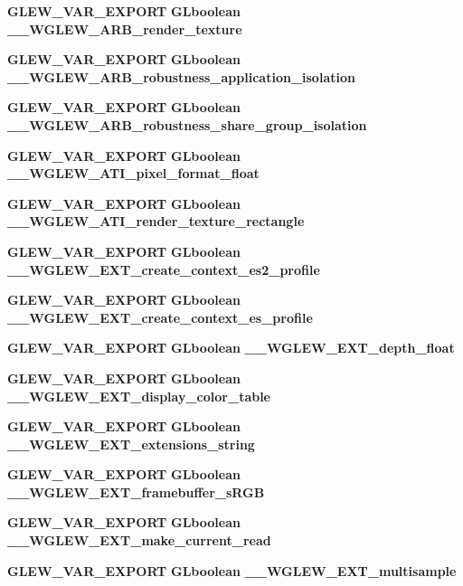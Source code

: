 \begin{DoxyCompactItemize}
{\bf G\+L\+E\+W\+\_\+\+V\+A\+R\+\_\+\+E\+X\+P\+O\+RT} {\bf G\+Lboolean} {\bf \+\_\+\+\_\+\+W\+G\+L\+E\+W\+\_\+\+A\+R\+B\+\_\+render\+\_\+texture}
\item 
{\bf G\+L\+E\+W\+\_\+\+V\+A\+R\+\_\+\+E\+X\+P\+O\+RT} {\bf G\+Lboolean} {\bf \+\_\+\+\_\+\+W\+G\+L\+E\+W\+\_\+\+A\+R\+B\+\_\+robustness\+\_\+application\+\_\+isolation}
\item 
{\bf G\+L\+E\+W\+\_\+\+V\+A\+R\+\_\+\+E\+X\+P\+O\+RT} {\bf G\+Lboolean} {\bf \+\_\+\+\_\+\+W\+G\+L\+E\+W\+\_\+\+A\+R\+B\+\_\+robustness\+\_\+share\+\_\+group\+\_\+isolation}
\item 
{\bf G\+L\+E\+W\+\_\+\+V\+A\+R\+\_\+\+E\+X\+P\+O\+RT} {\bf G\+Lboolean} {\bf \+\_\+\+\_\+\+W\+G\+L\+E\+W\+\_\+\+A\+T\+I\+\_\+pixel\+\_\+format\+\_\+float}
\item 
{\bf G\+L\+E\+W\+\_\+\+V\+A\+R\+\_\+\+E\+X\+P\+O\+RT} {\bf G\+Lboolean} {\bf \+\_\+\+\_\+\+W\+G\+L\+E\+W\+\_\+\+A\+T\+I\+\_\+render\+\_\+texture\+\_\+rectangle}
\item 
{\bf G\+L\+E\+W\+\_\+\+V\+A\+R\+\_\+\+E\+X\+P\+O\+RT} {\bf G\+Lboolean} {\bf \+\_\+\+\_\+\+W\+G\+L\+E\+W\+\_\+\+E\+X\+T\+\_\+create\+\_\+context\+\_\+es2\+\_\+profile}
\item 
{\bf G\+L\+E\+W\+\_\+\+V\+A\+R\+\_\+\+E\+X\+P\+O\+RT} {\bf G\+Lboolean} {\bf \+\_\+\+\_\+\+W\+G\+L\+E\+W\+\_\+\+E\+X\+T\+\_\+create\+\_\+context\+\_\+es\+\_\+profile}
\item 
{\bf G\+L\+E\+W\+\_\+\+V\+A\+R\+\_\+\+E\+X\+P\+O\+RT} {\bf G\+Lboolean} {\bf \+\_\+\+\_\+\+W\+G\+L\+E\+W\+\_\+\+E\+X\+T\+\_\+depth\+\_\+float}
\item 
{\bf G\+L\+E\+W\+\_\+\+V\+A\+R\+\_\+\+E\+X\+P\+O\+RT} {\bf G\+Lboolean} {\bf \+\_\+\+\_\+\+W\+G\+L\+E\+W\+\_\+\+E\+X\+T\+\_\+display\+\_\+color\+\_\+table}
\item 
{\bf G\+L\+E\+W\+\_\+\+V\+A\+R\+\_\+\+E\+X\+P\+O\+RT} {\bf G\+Lboolean} {\bf \+\_\+\+\_\+\+W\+G\+L\+E\+W\+\_\+\+E\+X\+T\+\_\+extensions\+\_\+string}
\item 
{\bf G\+L\+E\+W\+\_\+\+V\+A\+R\+\_\+\+E\+X\+P\+O\+RT} {\bf G\+Lboolean} {\bf \+\_\+\+\_\+\+W\+G\+L\+E\+W\+\_\+\+E\+X\+T\+\_\+framebuffer\+\_\+s\+R\+GB}
\item 
{\bf G\+L\+E\+W\+\_\+\+V\+A\+R\+\_\+\+E\+X\+P\+O\+RT} {\bf G\+Lboolean} {\bf \+\_\+\+\_\+\+W\+G\+L\+E\+W\+\_\+\+E\+X\+T\+\_\+make\+\_\+current\+\_\+read}
\item 
{\bf G\+L\+E\+W\+\_\+\+V\+A\+R\+\_\+\+E\+X\+P\+O\+RT} {\bf G\+Lboolean} {\bf \+\_\+\+\_\+\+W\+G\+L\+E\+W\+\_\+\+E\+X\+T\+\_\+multisample}
\item 

\end{DoxyCompactItemize}
